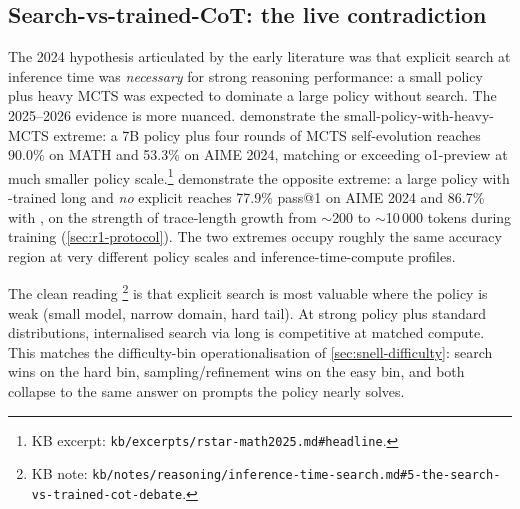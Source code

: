 \subsection{Search-vs-trained-CoT: the live contradiction}
\label{sec:tree-search-vs-cot}

The 2024 hypothesis articulated by the early  literature
was that explicit search at inference time was \emph{necessary} for
strong reasoning performance: a small policy plus heavy MCTS was
expected to dominate a large policy without search. The 2025--2026
evidence is more nuanced. \citet[\S 4]{rstar-math2025} demonstrate
the small-policy-with-heavy-MCTS extreme: a 7B policy plus four rounds
of MCTS self-evolution reaches 90.0\% on MATH and 53.3\% on AIME 2024,
matching or exceeding o1-preview at much smaller policy
scale.\footnote{KB excerpt:
\nolinkurl{kb/excerpts/rstar-math2025.md#headline}.} \citet{deepseek-r1}
demonstrate the opposite extreme: a large policy with -trained
long  and \emph{no} explicit  reaches
77.9\% pass@1 on AIME 2024 and 86.7\% with , on the
strength of trace-length growth from $\sim$200 to $\sim$10\,000 tokens
during training (\cref{sec:r1-protocol}). The two extremes occupy
roughly the same accuracy region at very different policy scales and
inference-time-compute profiles.

The clean reading%
\footnote{KB note:
\nolinkurl{kb/notes/reasoning/inference-time-search.md#5-the-search-vs-trained-cot-debate}.}
is that explicit search is most valuable where the policy is weak
(small model, narrow domain, hard tail). At strong policy plus
standard distributions, internalised search via long  is
competitive at matched compute. This matches the difficulty-bin
operationalisation of \cref{sec:snell-difficulty}: search wins on
the hard bin, sampling/refinement wins on the easy bin, and both
collapse to the same answer on prompts the policy nearly solves.

